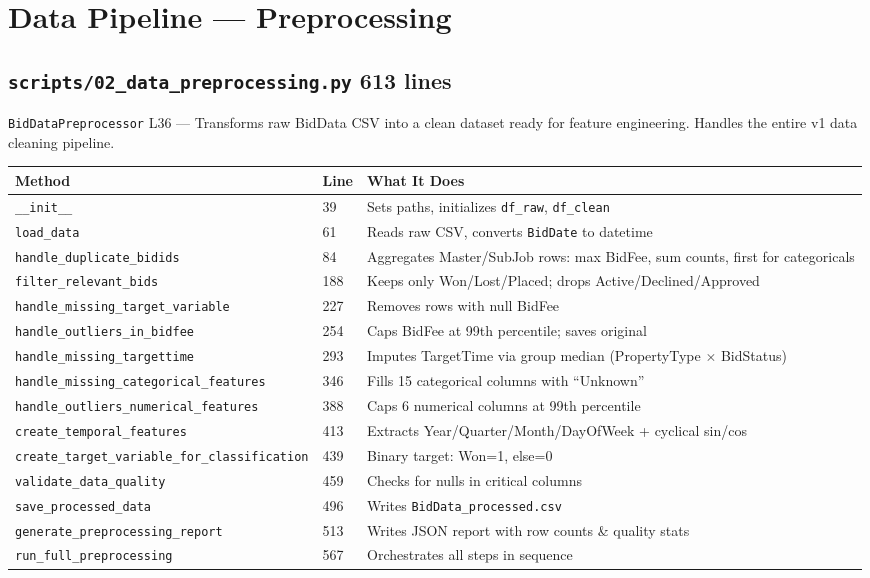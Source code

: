 \documentclass[11pt,a4paper]{article}
\newcommand{\file}[1]{\texttt{\color{gssblue!70!black}#1}}
\newcommand{\func}[1]{\texttt{\color{gssgreen!80!black}#1}}
\newcommand{\cls}[1]{\texttt{\color{uipurple}#1}}
\newcommand{\lineref}[1]{\textcolor{gssgray}{\small L#1}}
\newcommand{\pipetag}[1]{\colorbox{pipeblue!15}{\small\textcolor{pipeblue}{\textbf{#1}}}}
\begin{document}
\section{Data Pipeline --- Preprocessing}
\label{sec:preprocessing}

\subsection{\file{scripts/02\_data\_preprocessing.py} \pipetag{613 lines}}

\cls{BidDataPreprocessor} \lineref{36} --- Transforms raw BidData CSV into a clean
dataset ready for feature engineering. Handles the entire v1 data cleaning pipeline.

\begin{longtable}{l l p{8cm}}
\toprule
\textbf{Method} & \textbf{Line} & \textbf{What It Does} \\
\midrule
\endhead
\func{\_\_init\_\_} & 39 & Sets paths, initializes \texttt{df\_raw}, \texttt{df\_clean} \\
\func{load\_data} & 61 & Reads raw CSV, converts \texttt{BidDate} to datetime \\
\func{handle\_duplicate\_bidids} & 84 & Aggregates Master/SubJob rows: max BidFee, sum counts, first for categoricals \\
\func{filter\_relevant\_bids} & 188 & Keeps only Won/Lost/Placed; drops Active/Declined/Approved \\
\func{handle\_missing\_target\_variable} & 227 & Removes rows with null BidFee \\
\func{handle\_outliers\_in\_bidfee} & 254 & Caps BidFee at 99th percentile; saves original \\
\func{handle\_missing\_targettime} & 293 & Imputes TargetTime via group median (PropertyType $\times$ BidStatus) \\
\func{handle\_missing\_categorical\_features} & 346 & Fills 15 categorical columns with ``Unknown'' \\
\func{handle\_outliers\_numerical\_features} & 388 & Caps 6 numerical columns at 99th percentile \\
\func{create\_temporal\_features} & 413 & Extracts Year/Quarter/Month/DayOfWeek + cyclical sin/cos \\
\func{create\_target\_variable\_for\_classification} & 439 & Binary target: Won=1, else=0 \\
\func{validate\_data\_quality} & 459 & Checks for nulls in critical columns \\
\func{save\_processed\_data} & 496 & Writes \file{BidData\_processed.csv} \\
\func{generate\_preprocessing\_report} & 513 & Writes JSON report with row counts \& quality stats \\
\func{run\_full\_preprocessing} & 567 & Orchestrates all steps in sequence \\
\bottomrule
\end{longtable}
\end{document}
